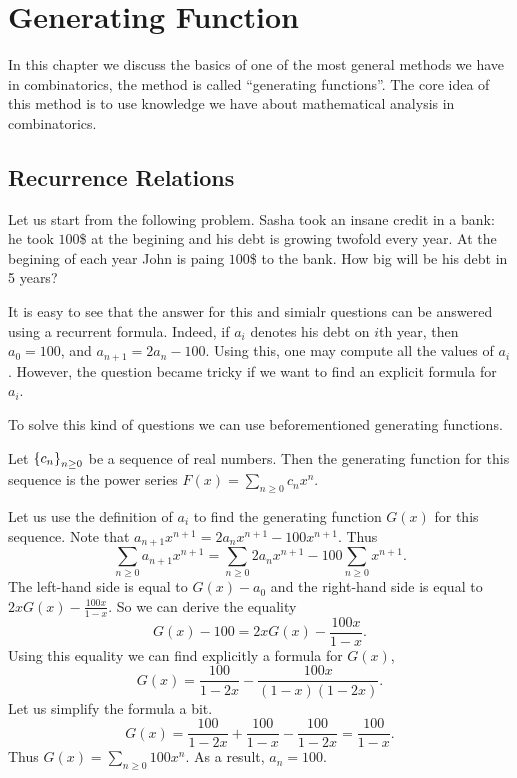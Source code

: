 \chapter{Generating Function}
In this chapter we discuss the basics of one of the most general methods we have
in combinatorics, the method is called ``generating functions''. The core idea
of this method is to use knowledge we have about mathematical analysis in
combinatorics.

\section{Recurrence Relations}
Let us start from the following problem.
Sasha took an insane credit in a bank: he took $100$\$ at the begining and
his debt is growing twofold every year. At the begining of each year John is
paing $100$\$ to the bank. How big will be his debt in 5 years?

It is easy to see that the answer for this and simialr questions can be answered
using a recurrent formula. Indeed, if $a_i$ denotes his debt on $i$th year,
then $a_0 = 100$, and $a_{n + 1} = 2 a_n - 100$. Using this, one may compute
all the values of $a_i$. However, the question became tricky if we want to
find an explicit formula for $a_i$.

To solve this kind of questions we can use beforementioned generating functions.
\begin{definition}
  Let $\set{c_n}_{n \ge 0}$ be a sequence of real numbers. Then
  the generating function for this sequence is the power series
  $F(x) = \sum_{n \ge 0} c_n x^n$.
\end{definition}

Let us use the definition of $a_i$ to find the generating function $G(x)$
for this sequence. Note that
$a_{n + 1} x^{n + 1} = 2 a_n x^{n + 1} - 100 x^{n + 1}$. Thus
\[
  \sum_{n \ge 0} a_{n + 1} x^{n + 1} =
    \sum_{n \ge 0} 2 a_n x^{n + 1} - 100 \sum_{n \ge 0} x^{n + 1}.
\]
The left-hand side is equal to $G(x) - a_0$ and the right-hand side is
equal to $2xG(x) - \frac{100 x}{1 - x}$. So we can derive the equality
\[
  G(x) - 100 = 2xG(x) - \frac{100 x}{1 - x}.
\]
Using this equality we can find explicitly a formula for $G(x)$,
\[
  G(x) = \frac{100}{1 - 2x} - \frac{100x}{(1 - x)(1 - 2x)}.
\]
Let us simplify the formula a bit.
\[
  G(x) = \frac{100}{1 - 2x} + \frac{100}{1 - x} - \frac{100}{1 - 2x} =
  \frac{100}{1 - x}.
\]
Thus $G(x) = \sum_{n \ge 0} 100 x^n$. As a result, $a_n = 100$.

